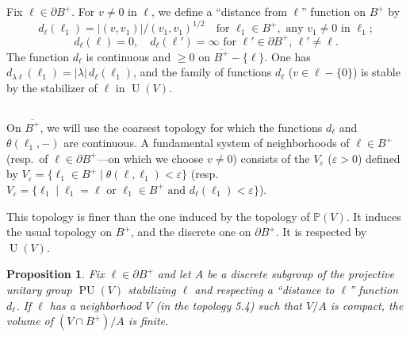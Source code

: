 \documentclass[12pt,a4paper]{article}
\theoremstyle{plain}
\newtheorem{proposition}[theorem]{Proposition}
\theoremstyle{definition}
\theoremstyle{remark}
\DeclareMathOperator{\PU}{PU}
\newcommand{\PP}{\mathbb{P}}
\numberwithin{equation}{section}
\providecommand{\PP}{\mathbb{P}}
\providecommand{\U}{\operatorname{U}}
\begin{document}
\subsection{}
Fix $\ell \in \partial B^+$. For $v \neq 0$ in $\ell$, we define a ``distance from $\ell$'' function on $B^+$ by
\begin{equation}\label{eq:5.3.1}
d_\ell(\ell_1) = |(v, v_1)| / (v_1, v_1)^{1/2} \quad \text{for } \ell_1 \in B^+, \text{ any } v_1 \neq 0 \text{ in } \ell_1;
\end{equation}
\begin{equation}\label{eq:5.3.2}
d_\ell(\ell) = 0, \quad d_\ell(\ell') = \infty \text{ for } \ell' \in \partial B^+, \, \ell' \neq \ell.
\end{equation}
The function $d_\ell$ is continuous and $\geq 0$ on $\overline{B^+} - \{\ell\}$. One has $d_{\lambda \ell}(\ell_1) = |\lambda| \, d_\ell(\ell_1)$, and the family of functions $d_\ell$ ($v \in \ell - \{0\}$) is stable by the stabilizer of $\ell$ in $\U(V)$.

\subsection{}
On $\overline{B^+}$, we will use the coarsest topology for which the functions $d_\ell$ and $\theta(\ell_1, -)$ are continuous. A fundamental system of neighborhoods of $\ell \in B^+$ (resp.\ of $\ell \in \partial B^+$---on which we choose $v \neq 0$) consists of the $V_\varepsilon$ ($\varepsilon > 0$) defined by $V_\varepsilon = \{\ell_1 \in B^+ \mid \theta(\ell, \ell_1) < \varepsilon\}$ (resp.\ $V_\varepsilon = \{\ell_1 \mid \ell_1 = \ell \text{ or } \ell_1 \in B^+ \text{ and } d_\ell(\ell_1) < \varepsilon\}$).

This topology is finer than the one induced by the topology of $\PP(V)$. It induces the usual topology on $B^+$, and the discrete one on $\partial B^+$. It is respected by $\U(V)$.

\begin{proposition}\label{prop:5.5}
Fix $\ell \in \partial B^+$ and let $A$ be a discrete subgroup of the projective unitary group $\PU(V)$ stabilizing $\ell$ and respecting a ``distance to $\ell$'' function $d_\ell$. If $\ell$ has a neighborhood $V$ (in the topology 5.4) such that $V/A$ is compact, the volume of $(V \cap B^+)/A$ is finite.
\end{proposition}
\end{document}

